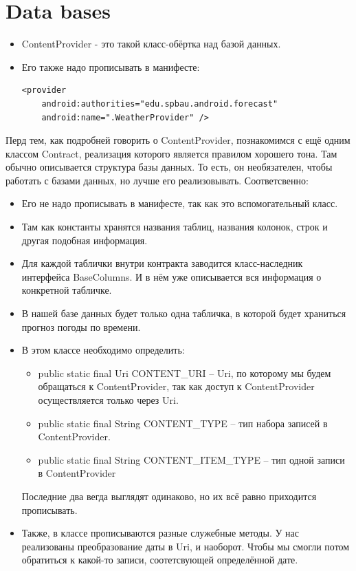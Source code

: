 \documentclass[12 pt]{article}
\begin{document}
\section{Data bases}
	\begin{itemize}
		\item ContentProvider - это такой класс-обёртка над базой данных.
		\item Его также надо прописывать в манифесте:
		\begin{lstlisting}
<provider
	android:authorities="edu.spbau.android.forecast"
    android:name=".WeatherProvider" />		
		\end{lstlisting}
	\end{itemize}    
	Перд тем, как подробней говорить о ContentProvider, познакомимся с ещё одним классом Contract, реализация которого является правилом хорошего тона. Там обычно описывается структура базы данных. То есть, он необязателен, чтобы работать с базами данных, но лучше его реализовывать.
	Соответсвенно:
	\begin{itemize}
	    \item Его не надо прописывать в манифесте, так как это вспомогательный класс.
	    \item Там как константы хранятся названия таблиц, названия колонок, строк и другая подобная информация.
	    \item Для каждой таблички внутри контракта заводится класс-наследник интерфейса BaseColumns. И в нём уже описывается вся информация о конкретной табличке. 
	    \item В нашей базе данных будет только одна табличка, в которой будет храниться прогноз погоды по времени.
	    \item В этом классе необходимо определить: 
	    \begin{itemize}
	        \item public static final Uri CONTENT\_URI -- Uri, по которому мы будем обращаться к ContentProvider, так как доступ к ContentProvider осуществляется только через Uri. 
	        \item public static final String CONTENT\_TYPE -- тип набора записей в ContentProvider.
	        \item public static final String CONTENT\_ITEM\_TYPE -- тип одной записи в ContentProvider
	    \end{itemize}
	    Последние два вегда выглядят одинаково, но их всё равно приходится прописывать.
	    \item Также, в классе прописываются разные служебные методы. У нас реализованы преобразование даты в Uri, и наоборот. Чтобы мы смогли потом обратиться к какой-то записи, соотетсвующей определённой дате.
	\end{itemize}
	
\end{document}
